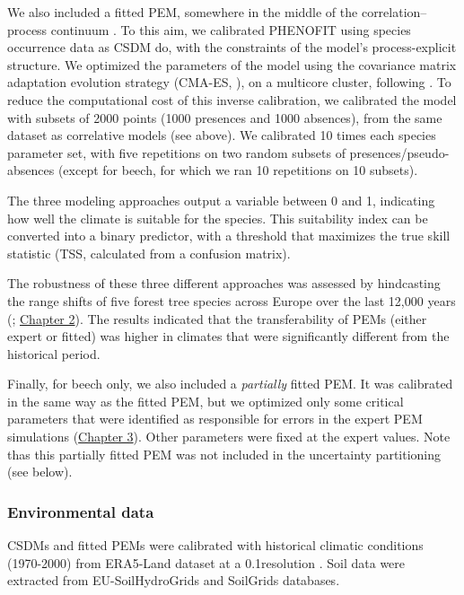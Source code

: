 \documentclass[letterpaper,8pt]{article}  %
\begin{document}
\begin{doublespacing}
\begin{linenumbers}
We also included a fitted PEM, somewhere in the middle of the correlation–process continuum \citep{Dormann2012}. To this aim, we calibrated PHENOFIT using species occurrence data as CSDM do, with the constraints of the model's process-explicit structure. We optimized the parameters of the model using the covariance matrix adaptation evolution strategy (CMA-ES, \citep{Hansen2001}), on a multicore cluster, following \citet{VanderMeersch2023}. To reduce the computational cost of this inverse calibration, we calibrated the model with subsets of 2000 points (1000 presences and 1000 absences), from the same dataset as correlative models (see above). We calibrated 10 times each species parameter set, with five repetitions on two random subsets of presences/pseudo-absences (except for beech, for which we ran 10 repetitions on 10 subsets).

The three modeling approaches output a variable between 0 and 1, indicating how well the climate is suitable for the species. This suitability index can be converted into a binary predictor, with a threshold that maximizes the true skill statistic (TSS, calculated from a confusion matrix). 

The robustness of these three different approaches was assessed by hindcasting the range shifts of five forest tree species across Europe over the last 12,000 years (\citealp{VanderMeersch2024}; \hyperref[chapter2]{Chapter 2}). The results indicated that the transferability of PEMs (either expert or fitted) was higher in climates that were significantly different from the historical period.

Finally, for beech only, we also included a \emph{partially} fitted PEM. It was calibrated in the same way as the fitted PEM, but we optimized only some critical parameters that were identified as responsible for errors in the expert PEM simulations (\hyperref[chapter3]{Chapter 3}). Other parameters were fixed at the expert values. Note thas this partially fitted PEM was not included in the uncertainty partitioning (see below).

\subsubsection{Environmental data}

CSDMs and fitted PEMs were calibrated with historical climatic conditions (1970-2000) from ERA5-Land dataset at a 0.1\degree resolution \citep{MunozSabater2021}. Soil data were extracted from EU-SoilHydroGrids \citep{Toth2017} and SoilGrids \citep{Hengl2017} databases.


\end{linenumbers}
\end{doublespacing}
\end{document}
